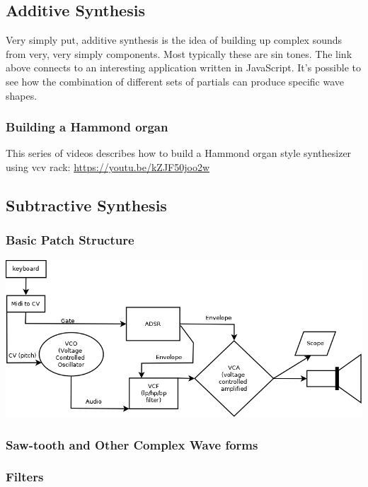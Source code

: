 \documentclass[11pt]{article}
\begin{document}
\subsection{Additive Synthesis}
\label{sec:org7e5fd07}
Very simply put, additive synthesis is the idea of building up complex
sounds from very, very simply components. Most typically these are sin
tones. The link above connects to an interesting application written
in JavaScript. It's possible to see how the combination of different
sets of partials can produce specific wave shapes. 

\subsubsection{Building a Hammond organ}
\label{sec:org4bc128a}
This series of videos describes how to build a Hammond organ style
synthesizer using vcv rack: \url{https://youtu.be/kZJF50joo2w}



\subsection{Subtractive Synthesis}
\label{sec:orge2ac10e}

\subsubsection{Basic Patch Structure}
\label{sec:org2dde1ca}
\begin{center}
\includegraphics[width=.9\linewidth]{./basicSubtractive.png}
\end{center}


\subsubsection{Saw-tooth and Other Complex Wave forms}
\label{sec:org477639e}
\subsubsection{Filters}
\label{sec:orgb0529db}
\end{document}
